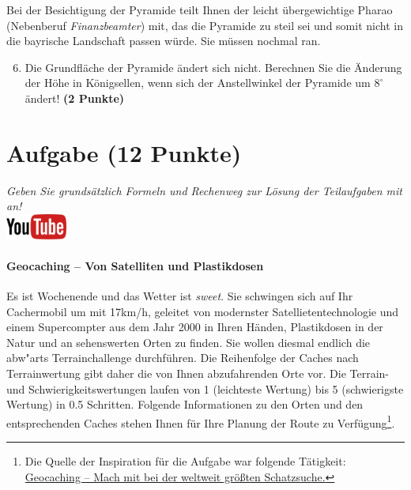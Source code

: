 \documentclass[a4paper, 9pt]{scrartcl}\usepackage[]{graphicx}\usepackage[]{xcolor}
\begin{document}
Bei der Besichtigung der Pyramide teilt Ihnen der leicht {\"u}bergewichtige
Pharao (Nebenberuf \textit{Finanzbeamter}) mit, das die Pyramide zu
steil sei und somit nicht in die bayrische Landschaft passen
w{\"u}rde. Sie m{\"u}ssen nochmal ran.

\begin{enumerate}
  \setcounter{enumi}{5}
\item Die Grundfl{\"a}che der Pyramide {\"a}ndert sich nicht. Berechnen Sie die
  {\"A}nderung der H{\"o}he in K{\"o}nigsellen, wenn sich der Anstellwinkel der
  Pyramide um $8^\circ$ {\"a}ndert!  \textbf{(2 Punkte)}
\end{enumerate}



\clearpage

\section{Aufgabe \hfill (12 Punkte)}

\textit{Geben Sie grunds{\"a}tzlich Formeln und Rechenweg zur L{\"o}sung der
  Teilaufgaben mit an!} \\[1Ex]

\hfill\href{https://youtu.be/3LAq3R0rS14}{\includegraphics[width =
  2cm]{img/youtube}} %
\hspace{2Ex}

\paragraph{Geocaching -- Von Satelliten und Plastikdosen}



Es ist Wochenende und das Wetter ist \textit{sweet}. Sie schwingen sich auf
Ihr Cachermobil um mit 17km/h, geleitet von modernster
Satellietentechnologie und einem Supercompter aus dem Jahr 2000 in Ihren
H{\"a}nden, Plastikdosen in der Natur und an sehenswerten Orten zu finden. Sie
wollen diesmal endlich die abw{"a}rts Terrainchallenge
durchf{\"u}hren. Die Reihenfolge der Caches nach Terrainwertung gibt daher
die von Ihnen abzufahrenden Orte vor. Die Terrain- und
Schwierigkeitswertungen laufen von 1 (leichteste Wertung) bis 5
(schwierigste Wertung) in 0.5 Schritten. Folgende Informationen zu den
Orten und den entsprechenden Caches stehen Ihnen f{\"u}r Ihre Planung der Route
zu Verf{\"u}gung\footnote{Die Quelle der Inspiration
  für die Aufgabe war folgende Tätigkeit:
  \href{https://www.geocaching.com/play}{Geocaching -- Mach mit bei der weltweit größten Schatzsuche.}}.
\end{document}
